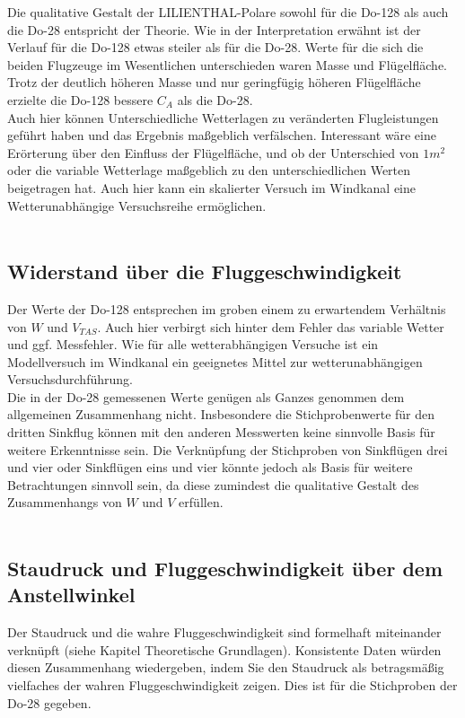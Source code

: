 Die qualitative Gestalt der LILIENTHAL-Polare sowohl für die Do-128 als auch die Do-28 entspricht der Theorie. Wie in der Interpretation erwähnt ist der Verlauf für die Do-128 etwas steiler als für die Do-28. Werte für die sich die beiden Flugzeuge im Wesentlichen unterschieden waren Masse und Flügelfläche. Trotz der deutlich höheren Masse und nur geringfügig höheren Flügelfläche erzielte die Do-128 bessere $C_{A}$ als die Do-28.\\
Auch hier können Unterschiedliche Wetterlagen zu veränderten Flugleistungen geführt haben und das Ergebnis maßgeblich verfälschen.
Interessant wäre eine Erörterung über den Einfluss der Flügelfläche, und ob der Unterschied von $1m^{2}$ oder die variable Wetterlage maßgeblich zu den unterschiedlichen Werten beigetragen hat. Auch hier kann ein skalierter Versuch im Windkanal eine Wetterunabhängige Versuchsreihe ermöglichen.\\\\

\subsection{Widerstand über die Fluggeschwindigkeit}

Der Werte der Do-128 entsprechen im groben einem zu erwartendem Verhältnis von $W$ und $V_{TAS}$. Auch hier verbirgt sich hinter dem Fehler das variable Wetter und ggf. Messfehler. Wie für alle wetterabhängigen Versuche ist ein Modellversuch im Windkanal ein geeignetes Mittel zur wetterunabhängigen Versuchsdurchführung.\\
Die in der Do-28 gemessenen Werte genügen als Ganzes genommen dem allgemeinen Zusammenhang nicht. Insbesondere die Stichprobenwerte für den dritten Sinkflug können mit den anderen Messwerten keine sinnvolle Basis für weitere Erkenntnisse sein.
Die Verknüpfung der Stichproben von Sinkflügen drei und vier oder Sinkflügen eins und vier könnte jedoch als Basis für weitere Betrachtungen sinnvoll sein, da diese zumindest die qualitative Gestalt des Zusammenhangs von $W$ und $V$ erfüllen.\\\\

\subsection{Staudruck und Fluggeschwindigkeit über dem Anstellwinkel}
Der Staudruck und die wahre Fluggeschwindigkeit sind formelhaft miteinander verknüpft (siehe Kapitel Theoretische Grundlagen). Konsistente Daten würden diesen Zusammenhang wiedergeben, indem Sie den Staudruck als betragsmäßig vielfaches der wahren Fluggeschwindigkeit zeigen. Dies ist für die Stichproben der Do-28 gegeben.
\newpage

